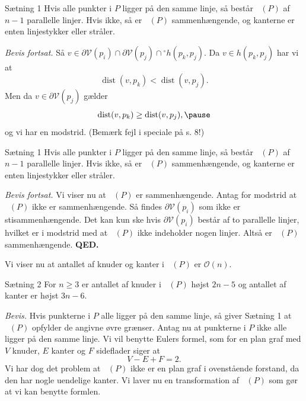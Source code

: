 \documentclass{beamer} %
\newcommand{\longpause}{\break \break \pause}
\DeclareMathOperator{\dist}{dist}
\DeclareMathOperator{\VorG}{Vor_{G}}
\begin{document}
\begin{frame}
\begin{block}{Sætning 1}
Hvis alle punkter i $P$ ligger på den samme linje, så består $\VorG(P)$ af $n - 1$ parallelle linjer.
Hvis ikke, så er $\VorG(P)$ sammenhængende, og kanterne er enten linjestykker eller stråler.
\end{block}
\textit{Bevis fortsat.} \pause Så $v \in \partial \mathcal{V}(p_i) \cap \partial \mathcal{V}(p_j) \cap {}^{\circ}h(p_k, p_j)$. \pause Da $v \in h(p_k, p_j)$ har vi at
\[
	\dist(v, p_k) < \dist(v, p_j).
\]
\pause Men da $v \in \partial \mathcal{V}(p_j)$ gælder
\[
	\dist(v, p_k) \geq \dist(v, p_j), \pause
\]
og vi har en modstrid. \pause (Bemærk fejl i speciale på s. 8!)
\end{frame}

\begin{frame}
\begin{block}{Sætning 1}
Hvis alle punkter i $P$ ligger på den samme linje, så består $\VorG(P)$ af $n - 1$ parallelle linjer.
Hvis ikke, så er $\VorG(P)$ sammenhængende, og kanterne er enten linjestykker eller stråler.
\end{block}
\textit{Bevis fortsat.} \pause Vi viser nu at $\VorG(P)$ er sammenhængende. \pause Antag for modstrid at $\VorG(P)$ ikke er sammenhængende. \pause Så findes $\partial \mathcal{V}(p_i)$ som ikke er stisammenhængende. \pause Det kan kun ske hvis $\partial \mathcal{V}(p_i)$ består af to parallelle linjer\pause, hvilket er i modstrid med at $\VorG(P)$ ikke indeholder nogen linjer. \pause Altså er $\VorG(P)$ sammenhængende. \textbf{QED.}
\end{frame}

\begin{frame}
\pause
Vi viser nu at antallet af knuder og kanter i $\VorG(P)$ er $\mathcal{O}(n)$.
\pause
\begin{block}{Sætning 2}
\pause
For $n \geq 3$ er antallet af knuder i $\VorG(P)$ højst $2n - 5$ \pause og antallet af kanter er højst $3n - 6$.
\end{block}
\pause \textit{Bevis.} \pause Hvis punkterne i $P$ alle ligger på den samme linje, så giver Sætning 1 at $\VorG(P)$ opfylder de angivne øvre grænser.
\longpause
Antag nu at punkterne i $P$ ikke alle ligger på den samme linje. \pause Vi vil benytte Eulers formel, som for en plan graf med \pause $V$ knuder, \pause $E$ kanter \pause og $F$ sideflader \pause siger at
\[
	V - E + F = 2.
\]
\pause Vi har dog det problem at $\VorG(P)$ ikke er en plan graf i ovenstående forstand, da den har nogle uendelige kanter. \pause Vi laver nu en transformation af $\VorG(P)$ som gør at vi kan benytte formlen.
\end{frame}
\end{document}
